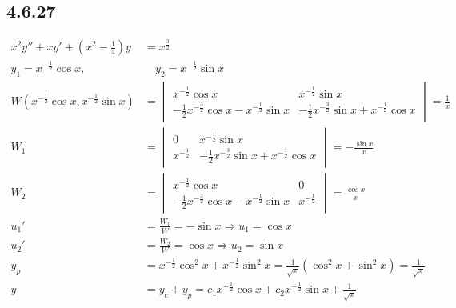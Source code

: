\documentclass{article}
\begin{document}
\subsection{4.6.27}
\begin{align*}
    x^2y''+xy'+\left(x^2-\frac{1}{4}\right)y &= x^{\frac{3}{2}}\\
    y_1 = x^{-\frac{1}{2}}\cos x, & \quad y_2 = x^{-\frac{1}{2}}\sin x\\
    W(x^{-\frac{1}{2}}\cos x, x^{-\frac{1}{2}}\sin x)  &= \begin{vmatrix} x^{-\frac{1}{2}}\cos x& x^{-\frac{1}{2}}\sin x \\-\frac{1}{2}x^{-\frac{3}{2}}\cos x-x^{-\frac{1}{2}}\sin x &-\frac{1}{2}x^{-\frac{3}{2}}\sin  x+x^{-\frac{1}{2}}\cos  x   \end{vmatrix} = \frac{1}{x}\\
    W_1 &= \begin{vmatrix}0 & x^{-\frac{1}{2}}\sin x \\ x^{-\frac{1}{2}} & -\frac{1}{2}x^{-\frac{3}{2}}\sin  x+x^{-\frac{1}{2}}\cos  x  \end{vmatrix}  = -\frac{\sin x}{x}\\
    W_2 &= \begin{vmatrix} x^{-\frac{1}{2}}\cos x& 0 \\-\frac{1}{2}x^{-\frac{3}{2}}\cos x-x^{-\frac{1}{2}}\sin x  & x^{-\frac{1}{2}}\end{vmatrix} = \frac{\cos x}{x}\\
    u_1' &= \frac{W_1}{W} = -\sin x \Rightarrow u_1=\cos x\\
    u_2' &= \frac{W_2}{W} = \cos x  \Rightarrow u_2=\sin x\\
    y_p &= x^{-\frac{1}{2}}\cos ^2x+x^{-\frac{1}{2}}\sin ^2x=\frac{1}{\sqrt{x}}(\cos ^2x+\sin ^2x)= \frac{1}{\sqrt{x}}\\
    y &= y_c+y_p=c_1x^{-\frac{1}{2}}\cos x+c_2x^{-\frac{1}{2}}\sin x+\frac{1}{\sqrt{x}}
\end{align*}
\end{document}
